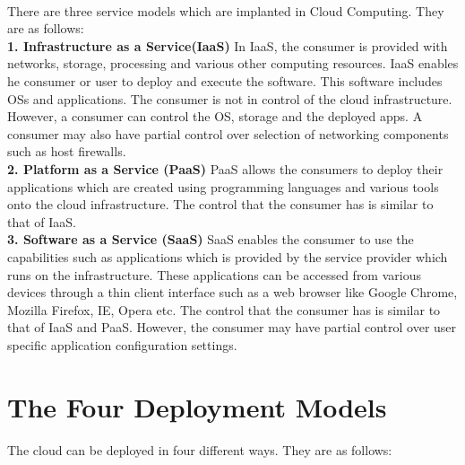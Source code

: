 \paragraph{\hspace{24pt}}
There are three service models which are implanted in Cloud Computing. They are as follows:\\
\textbf{1. Infrastructure as a Service(IaaS)} {In IaaS, the consumer is provided with networks, storage, processing and various other computing resources. IaaS enables he consumer or user to deploy and execute the software. This software includes OSs and applications. The consumer is not in control of the cloud infrastructure. However, a consumer can control the OS, storage and the deployed apps. A consumer may also have partial control over selection of networking components such as host firewalls.}\\
\textbf{2. Platform as a Service (PaaS)} {PaaS allows the consumers to deploy their applications which are created using programming languages and various tools onto the cloud infrastructure. The control that the consumer has is similar to that of IaaS.}\\
\textbf{3. Software as a Service (SaaS)} {SaaS enables the consumer to use the capabilities such as applications which is provided by the service provider which runs on the infrastructure. These applications can be accessed from various devices through a thin client interface such as a web browser like Google Chrome, Mozilla Firefox, IE, Opera etc. The control that the consumer has is similar to that of IaaS and PaaS. However, the consumer may have partial control over user specific application configuration settings.}

\section{The Four Deployment Models}
\paragraph{\hspace{24pt}}
The cloud can be deployed in four different ways. They are as follows:\\

